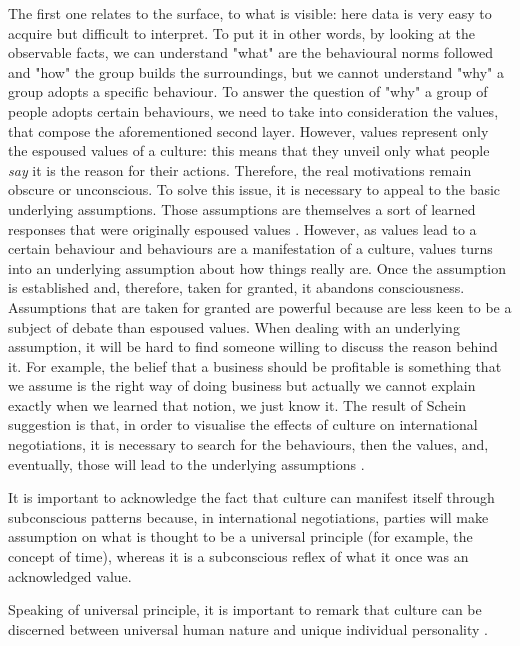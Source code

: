 \documentclass[../main.tex]{subfiles}
\begin{document}
The first one relates to the surface, to what is visible: here data is very easy to acquire but difficult to interpret. To put it in other words, by looking at the observable facts, we can understand "what" are the behavioural norms followed and "how" the group builds the surroundings, but we cannot understand "why" a group adopts a specific behaviour. To answer the question of "why" a group of people adopts certain behaviours, we need to take into consideration the values, that compose the aforementioned second layer. However, values represent only the espoused values of a culture: this means that they unveil only what people \textit{say} it is the reason for their actions. Therefore, the real motivations remain obscure or unconscious. To solve this issue, it is necessary to appeal to the basic underlying assumptions. Those assumptions are themselves a sort of learned responses that were originally espoused values \autocite[3]{schein}. However, as values lead to a certain behaviour and behaviours are a manifestation of a culture, values turns into an underlying assumption about how things really are. Once the assumption is established and, therefore, taken for granted, it abandons consciousness. Assumptions that are taken for granted are powerful because are less keen to be a subject of debate than espoused values. When dealing with an underlying assumption, it will be hard to find someone willing to discuss the reason behind it. For example, the belief that a business should be profitable is something that we assume is the right way of doing business but actually we cannot explain exactly when we learned that notion, we just know it. The result of Schein suggestion is that, in order to visualise the effects of culture on international negotiations, it is necessary to search for the behaviours, then the values, and, eventually, those will lead to the underlying assumptions \mancite\autocite[4]{schein}.

It is important to acknowledge the fact that culture can manifest itself through subconscious patterns because, in international negotiations, parties will make assumption on what is thought to be a universal principle (for example, the concept of time), whereas it is a subconscious reflex of what it once was an acknowledged value.

Speaking of universal principle, it is important to remark that culture can be discerned between universal human nature and unique individual personality \autocite[6]{helen}.
\end{document}
